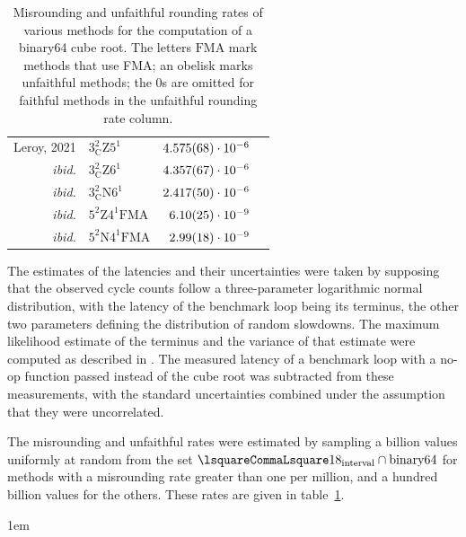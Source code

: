 ﻿\documentclass[10pt, a4paper, twoside]{basestyle}
\begin{document}
\begin{table}[b!]
\begin{center}
\begin{tabular}{rlrr}
Leroy, 2021 & \cbstart{}$3^2_{\mathrm{C}}\mathrm{Z}5^1$\cbend{} & $4.575(68)\cdot10^{-6}$ \\
\emph{ibid.}& \cbstart{}$3^2_{\mathrm{C}}\mathrm{Z}6^1$\cbend{} & $4.357(67)\cdot10^{-6}$ \\
\emph{ibid.}& $3^2_{\mathrm{C}}\mathrm{N}6^1$ & $2.417(50)\cdot10^{-6}$ \\
\emph{ibid.}& \cbstart{}$5^2\mathrm{Z}4^1\mathrm{FMA}$\cbend{}  & $6.10(25)\cdot10^{-9}$ \\
\emph{ibid.}& \cbstart{}$5^2\mathrm{N}4^1\mathrm{FMA}$\cbend{}  & $2.99(18)\cdot10^{-9}$
\end{tabular}
\end{center}
\cbstart{}\caption{Misrounding and unfaithful rounding rates of various methods for the computation of a binary64 cube root.
The letters $\mathrm{FMA}$ mark methods that use FMA; an obelisk marks unfaithful methods; the $0$s are omitted
for faithful methods in the unfaithful rounding rate column.\label{TableMisroundingRates}}\cbend{}
\end{table}
The estimates of the latencies and their uncertainties were taken by supposing that the observed cycle counts follow
a three-parameter logarithmic normal distribution, with the latency of the benchmark loop being its terminus, the other two
parameters defining the distribution of random slowdowns. The maximum likelihood estimate of the terminus and the variance
of that estimate were computed as described in \cite{Cohen1951}.
The measured latency of a benchmark loop with a no-op function passed instead of the cube root was subtracted from these measurements,
with the standard uncertainties combined under the assumption that they were uncorrelated.

The misrounding and unfaithful rates were estimated by sampling a billion values uniformly at random from the set
$\intclop{1}{8}\Intersection\text{binary64}$
for methods with a misrounding rate greater than one per million, and a hundred billion values for the others.
\cbstart{}These rates \cbend{}are given in table~\ref{TableMisroundingRates}.

\emergencystretch 1em
\end{document}
